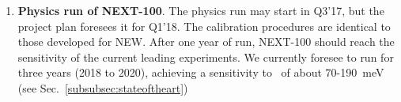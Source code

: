 \begin{enumerate}
\item {\bf Physics run of NEXT-100}. The physics run may start in Q3'17, but the project plan foresees it for Q1'18. The calibration procedures are identical to those developed for NEW. After one year of run, NEXT-100 should reach the sensitivity of the current leading experiments. We currently foresee to run for three years (2018 to 2020), achieving a sensitivity to \mbb\ of about 70-190~meV (see Sec.~\ref{subsubsec:stateoftheart})

\end{enumerate}
